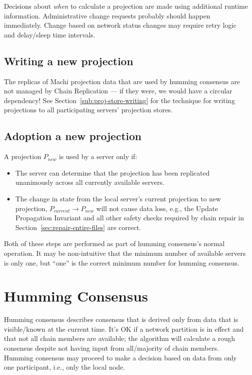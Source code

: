 \documentclass[preprint,10pt]{sigplanconf}
\begin{document}
Decisions about {\em when} to calculate a projection are made
using additional runtime information.  Administrative change requests
probably should happen immediately.  Change based on network status
changes may require retry logic and delay/sleep time intervals.

\subsection{Writing a new projection}
\label{sub:proj-storage-writing}

The replicas of Machi projection data that are used by humming consensus
are not managed by Chain Replication --- if they
were, we would have a circular dependency!  See
Section~\ref{sub:proj-store-writing} for the technique for writing
projections to all participating servers' projection stores.

\subsection{Adoption a new projection}
\label{sub:proj-adoption}

A projection $P_{new}$ is used by a server only if:

\begin{itemize}
\item The server can determine that the projection has been replicated
  unanimously across all currently available servers.
\item The change in state from the local server's current projection to new
  projection, $P_{current} \rightarrow P_{new}$ will not cause data loss,
  e.g., the Update Propagation Invariant and all other safety checks
  required by chain repair in Section~\ref{sec:repair-entire-files}
  are correct.
\end{itemize}

Both of these steps are performed as part of humming consensus's
normal operation.  It may be non-intuitive that the minimum number of
available servers is only one, but ``one'' is the correct minimum
 number for humming consensus.

\section{Humming Consensus}
\label{sec:humming-consensus}

Humming consensus describes consensus that is derived only from data
that is visible/known at the current time.  It's OK if a network
partition is in effect and that not all chain members are available;
the algorithm will calculate a rough consensus despite not
having input from all/majority of chain members.  Humming consensus
may proceed to make a decision based on data from only one
participant, i.e., only the local node.
\end{document}
